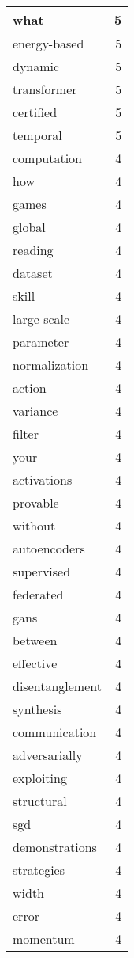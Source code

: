 \begin{table}[h]
\begin{tabular}{|l|r|}
\hline
what & 5 \\
\hline
energy-based & 5 \\
\hline
dynamic & 5 \\
\hline
transformer & 5 \\
\hline
certified & 5 \\
\hline
temporal & 5 \\
\hline
computation & 4 \\
\hline
how & 4 \\
\hline
games & 4 \\
\hline
global & 4 \\
\hline
reading & 4 \\
\hline
dataset & 4 \\
\hline
skill & 4 \\
\hline
large-scale & 4 \\
\hline
parameter & 4 \\
\hline
normalization & 4 \\
\hline
action & 4 \\
\hline
variance & 4 \\
\hline
filter & 4 \\
\hline
your & 4 \\
\hline
activations & 4 \\
\hline
provable & 4 \\
\hline
without & 4 \\
\hline
autoencoders & 4 \\
\hline
supervised & 4 \\
\hline
federated & 4 \\
\hline
gans & 4 \\
\hline
between & 4 \\
\hline
effective & 4 \\
\hline
disentanglement & 4 \\
\hline
synthesis & 4 \\
\hline
communication & 4 \\
\hline
adversarially & 4 \\
\hline
exploiting & 4 \\
\hline
structural & 4 \\
\hline
sgd & 4 \\
\hline
demonstrations & 4 \\
\hline
strategies & 4 \\
\hline
width & 4 \\
\hline
error & 4 \\
\hline
momentum & 4 \\
\hline

\end{tabular}
\end{table}
